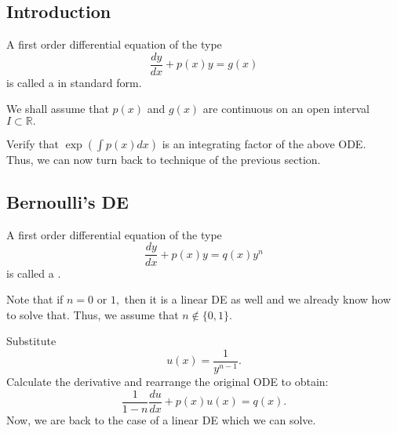 \subsection{Introduction}
\begin{defn}
	A first order differential equation of the type
	\[\dfrac{dy}{dx} + p(x)y = g(x)\]
	is called a  in standard form.
\end{defn}
We shall assume that $p(x)$ and $g(x)$ are continuous on an open interval $I \subset \mathbb{R}.$\\
\begin{mdframed}[style=boxstyle, frametitle={Solving such an ODE}]
	Verify that $\exp\left(\displaystyle\int p(x) dx\right)$ is an integrating factor of the above ODE.\\
	Thus, we can now turn back to technique of the previous section.
\end{mdframed}
\subsection{Bernoulli's DE}
\begin{defn}[Bernoulli's DE]
	A first order differential equation of the type
	\[\dfrac{dy}{dx} + p(x)y = q(x)y^n\]
	is called a .
\end{defn}
Note that if $n = 0$ or $1,$ then it is a linear DE as well and we already know how to solve that. Thus, we assume that $n \notin \{0, 1\}.$
\newpage
\begin{mdframed}[style=boxstyle, frametitle={Solving such an ODE}]
	Substitute \[u(x) = \dfrac{1}{y^{n-1}}.\]
	Calculate the derivative and rearrange the original ODE to obtain:
	\[\dfrac{1}{1 - n}\dfrac{du}{dx} + p(x)u(x) = q(x).\]
	Now, we are back to the case of a linear DE which we can solve.
\end{mdframed}
